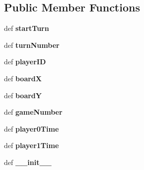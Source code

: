 \subsection*{Public Member Functions}
\begin{DoxyCompactItemize}
\item 
\hypertarget{classBaseAI_1_1BaseAI_a2dcbc8732112a39869c75ed9f0771633}{
def {\bfseries startTurn}}
\label{classBaseAI_1_1BaseAI_a2dcbc8732112a39869c75ed9f0771633}

\item 
\hypertarget{classBaseAI_1_1BaseAI_afa3d3ad590dd453c4d064a3c16b7f1a8}{
def {\bfseries turnNumber}}
\label{classBaseAI_1_1BaseAI_afa3d3ad590dd453c4d064a3c16b7f1a8}

\item 
\hypertarget{classBaseAI_1_1BaseAI_a60e0d6b3832faae7c85b4c9f0be10196}{
def {\bfseries playerID}}
\label{classBaseAI_1_1BaseAI_a60e0d6b3832faae7c85b4c9f0be10196}

\item 
\hypertarget{classBaseAI_1_1BaseAI_ae83628dc59335aa5c77e96ffcd57ce92}{
def {\bfseries boardX}}
\label{classBaseAI_1_1BaseAI_ae83628dc59335aa5c77e96ffcd57ce92}

\item 
\hypertarget{classBaseAI_1_1BaseAI_a6148bb3c3c46a7b33ce1818fd41eb605}{
def {\bfseries boardY}}
\label{classBaseAI_1_1BaseAI_a6148bb3c3c46a7b33ce1818fd41eb605}

\item 
\hypertarget{classBaseAI_1_1BaseAI_a32416775fed0eb83efe7221d732cbd70}{
def {\bfseries gameNumber}}
\label{classBaseAI_1_1BaseAI_a32416775fed0eb83efe7221d732cbd70}

\item 
\hypertarget{classBaseAI_1_1BaseAI_a3bf925534912eaebc263179a9c058f17}{
def {\bfseries player0Time}}
\label{classBaseAI_1_1BaseAI_a3bf925534912eaebc263179a9c058f17}

\item 
\hypertarget{classBaseAI_1_1BaseAI_a947dcca2869c60f33dbb3b553d70a321}{
def {\bfseries player1Time}}
\label{classBaseAI_1_1BaseAI_a947dcca2869c60f33dbb3b553d70a321}

\item 
\hypertarget{classBaseAI_1_1BaseAI_a0b938d864530091b6efd420a2ed38d10}{
def {\bfseries \_\-\_\-init\_\-\_\-}}
\label{classBaseAI_1_1BaseAI_a0b938d864530091b6efd420a2ed38d10}

\end{DoxyCompactItemize}
